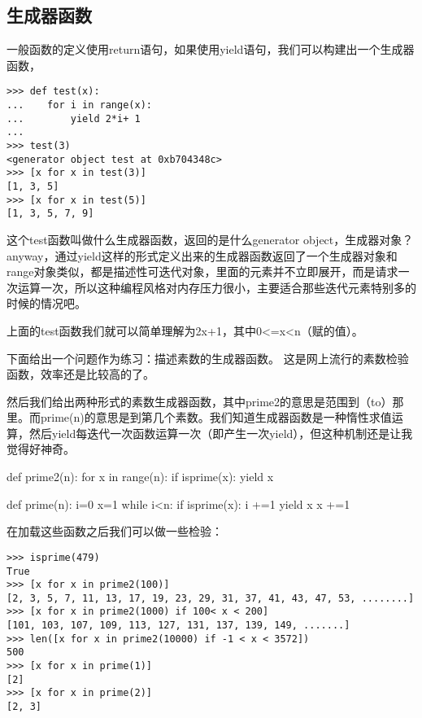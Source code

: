 \documentclass[12pt,oneside]{book}
\begin{document}
\begin{common-format}
\section{生成器函数}
一般函数的定义使用return语句，如果使用yield语句，我们可以构建出一个生成器函数，
\begin{Verbatim}
>>> def test(x):
...    for i in range(x):
...        yield 2*i+ 1
... 
>>> test(3)
<generator object test at 0xb704348c>
>>> [x for x in test(3)]
[1, 3, 5]
>>> [x for x in test(5)]
[1, 3, 5, 7, 9]
\end{Verbatim}

这个test函数叫做什么生成器函数，返回的是什么generator object，生成器对象？anyway，通过yield这样的形式定义出来的生成器函数返回了一个生成器对象和range对象类似，都是描述性可迭代对象，里面的元素并不立即展开，而是请求一次运算一次，所以这种编程风格对内存压力很小，主要适合那些迭代元素特别多的时候的情况吧。

上面的test函数我们就可以简单理解为2x+1，其中0<=x<n（赋的值）。

下面给出一个问题作为练习：描述素数的生成器函数。
这是网上流行的素数检验函数，效率还是比较高的了。

然后我们给出两种形式的素数生成器函数，其中prime2的意思是范围到（to）那里。而prime(n)的意思是到第几个素数。我们知道生成器函数是一种惰性求值运算，然后yield每迭代一次函数运算一次（即产生一次yield），但这种机制还是让我觉得好神奇。

\begin{tcbpython}
def prime2(n):
    for x in range(n):
        if isprime(x):
            yield x

def prime(n):
    i=0
    x=1
    while i<n:
        if isprime(x):
            i +=1
            yield x
        x +=1
\end{tcbpython}

在加载这些函数之后我们可以做一些检验：
\begin{Verbatim}
>>> isprime(479)
True
>>> [x for x in prime2(100)]
[2, 3, 5, 7, 11, 13, 17, 19, 23, 29, 31, 37, 41, 43, 47, 53, ........]
>>> [x for x in prime2(1000) if 100< x < 200]
[101, 103, 107, 109, 113, 127, 131, 137, 139, 149, .......]
>>> len([x for x in prime2(10000) if -1 < x < 3572])
500
>>> [x for x in prime(1)]
[2]
>>> [x for x in prime(2)]
[2, 3]
\end{Verbatim}




\end{common-format}
\end{document}
